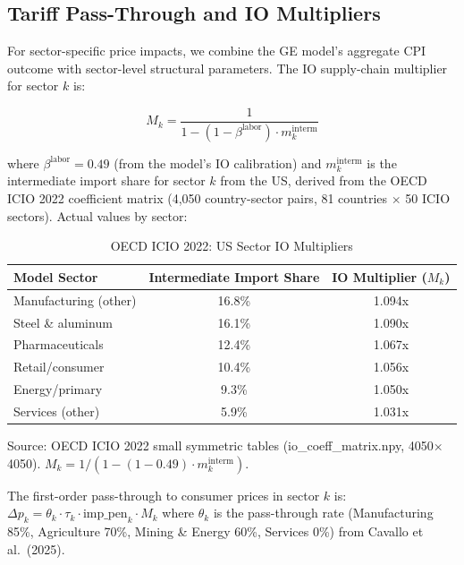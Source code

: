 \documentclass[12pt]{article}
\begin{document}
\subsection{Tariff Pass-Through and IO Multipliers}

For sector-specific price impacts, we combine the GE model's aggregate CPI
outcome with sector-level structural parameters. The IO supply-chain multiplier
for sector $k$ is:

\begin{equation}
M_k = \frac{1}{1 - (1 - \beta^{\text{labor}}) \cdot m_k^{\text{interm}}}
\end{equation}

where $\beta^{\text{labor}} = 0.49$ (from the model's IO calibration) and
$m_k^{\text{interm}}$ is the intermediate import share for sector $k$ from
the US, derived from the OECD ICIO 2022 coefficient matrix (4,050
country-sector pairs, 81 countries $\times$ 50 ICIO sectors). Actual
values by sector:

\begin{table}[H]
\centering
\caption{OECD ICIO 2022: US Sector IO Multipliers}
\label{tab:io_multipliers}
\begin{tabular}{lcc}
\toprule
Model Sector & Intermediate Import Share & IO Multiplier ($M_k$) \\
\midrule
Manufacturing (other) & 16.8\% & 1.094x \\
Steel \& aluminum     & 16.1\% & 1.090x \\
Pharmaceuticals       & 12.4\% & 1.067x \\
Retail/consumer       & 10.4\% & 1.056x \\
Energy/primary        &  9.3\% & 1.050x \\
Services (other)      &  5.9\% & 1.031x \\
\bottomrule
\end{tabular}
\begin{tablenotes}
\small
\item Source: OECD ICIO 2022 small symmetric tables (io\_coeff\_matrix.npy,
4050$\times$4050). $M_k = 1/(1-(1-0.49)\cdot m_k^{\text{interm}})$.
\end{tablenotes}
\end{table}

The first-order pass-through to consumer prices in sector $k$ is:
$\Delta p_k = \theta_k \cdot \tau_k \cdot \text{imp\_pen}_k \cdot M_k$
where $\theta_k$ is the pass-through rate (Manufacturing 85\%, Agriculture
70\%, Mining \& Energy 60\%, Services 0\%) from Cavallo et al.\ (2025).
\end{document}
